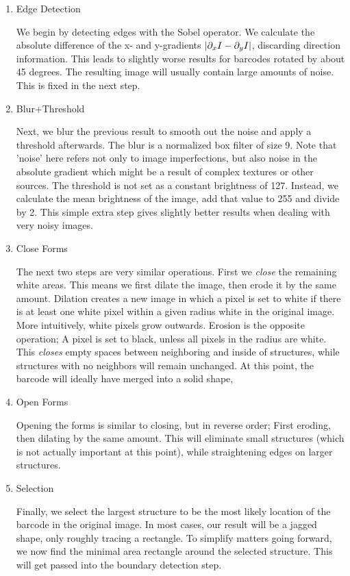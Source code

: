 \begin{enumerate}
	\item Edge Detection
	
	We begin by detecting edges with the Sobel operator. We calculate the absolute
  difference of the x- and y-gradients $\lvert\partial_x I - \partial_y I\rvert$,
  discarding direction information.
  This leads to slightly worse results for barcodes rotated by about 45 degrees. The resulting image will usually contain large amounts of noise. This is fixed in the next step. 

	\item Blur+Threshold
	
	Next, we blur the previous result to smooth out the noise and apply a threshold afterwards. The blur is a normalized box filter of size 9. Note that 'noise' here refers not only to image imperfections, but also noise in the absolute gradient which might be a result of complex textures or other sources. The threshold is not set as a constant brightness of 127. Instead, we calculate the mean brightness of the image, add that value to 255 and divide by 2. This simple extra step gives slightly better results when dealing with very noisy images.
	
	\item Close Forms
	
	The next two steps are very similar operations. First we \emph{close} the remaining white areas. This means we first dilate the image, then erode it by the same amount. Dilation creates a new image in which a pixel is set to white if there is at least one white pixel within a given radius white in the original image. More intuitively, white pixels grow outwards. Erosion is the opposite operation; A pixel is set to black, unless all pixels in the radius are white.  This \emph{closes} empty spaces between neighboring and inside of structures, while structures with no neighbors will remain unchanged. At this point, the barcode will ideally have merged into a solid shape, 
	
	\item Open Forms
	
	Opening the forms is similar to closing, but in reverse order; First eroding, then dilating by the same amount. This will eliminate small structures (which is not actually important at this point), while straightening edges on larger structures. 
	
	\item Selection
	
	Finally, we select the largest structure to be the most likely location of the barcode in the original image. In most cases, our result will be a jagged shape, only roughly tracing a rectangle. To simplify matters going forward, we now find the minimal area rectangle around the selected structure. This will get passed into the boundary detection step.
\end{enumerate}

